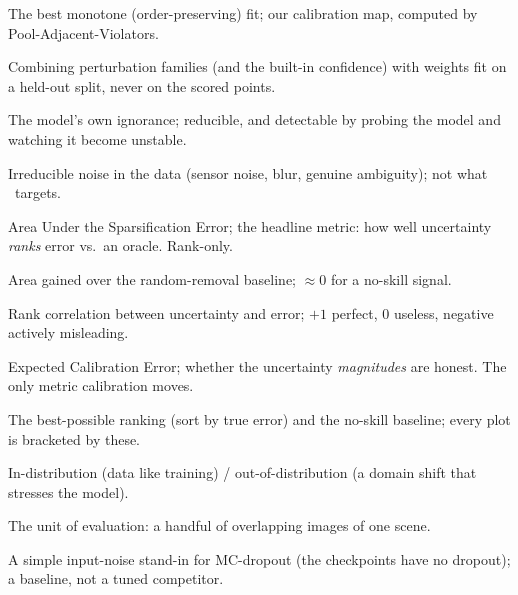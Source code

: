 \begin{description}[leftmargin=1.1em,itemsep=1.5pt,topsep=3pt,style=unboxed]
\item[Isotonic regression.] The best monotone (order-preserving) fit; our calibration map, computed by Pool-Adjacent-Violators.
\item[Held-out fusion.] Combining perturbation families (and the built-in confidence) with weights fit on a held-out split, never on the scored points.
\item[Epistemic uncertainty.] The model's own ignorance; reducible, and detectable by probing the model and watching it become unstable.
\item[Aleatoric uncertainty.] Irreducible noise in the data (sensor noise, blur, genuine ambiguity); not what \trustr\ targets.
\item[\ause\ ($\downarrow$).] Area Under the Sparsification Error; the headline metric: how well uncertainty \emph{ranks} error vs.\ an oracle. Rank-only.
\item[\aurg\ ($\uparrow$).] Area gained over the random-removal baseline; $\approx 0$ for a no-skill signal.
\item[Spearman $\rho$ ($\uparrow$).] Rank correlation between uncertainty and error; $+1$ perfect, $0$ useless, negative actively misleading.
\item[\ece\ ($\downarrow$).] Expected Calibration Error; whether the uncertainty \emph{magnitudes} are honest. The only metric calibration moves.
\item[Oracle / random.] The best-possible ranking (sort by true error) and the no-skill baseline; every plot is bracketed by these.
\item[ID / OOD.] In-distribution (data like training) / out-of-distribution (a domain shift that stresses the model).
\item[View-set.] The unit of evaluation: a handful of overlapping images of one scene.
\item[MC baseline.] A simple input-noise stand-in for MC-dropout (the checkpoints have no dropout); a baseline, not a tuned competitor.
\end{description}
